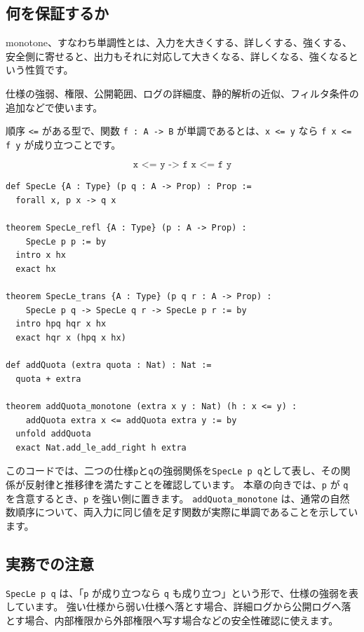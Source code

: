 \subsection{何を保証するか}

monotone、すなわち単調性とは、入力を大きくする、詳しくする、強くする、安全側に寄せると、出力もそれに対応して大きくなる、詳しくなる、強くなるという性質です。

仕様の強弱、権限、公開範囲、ログの詳細度、静的解析の近似、フィルタ条件の追加などで使います。

順序 \texttt{<=} がある型で、関数 \texttt{f : A -> B} が単調であるとは、\texttt{x <= y} なら \texttt{f x <= f y} が成り立つことです。

\[
\texttt{x <= y -> f x <= f y}
\]

\begin{listing}[htbp]
\begin{verbatim}
def SpecLe {A : Type} (p q : A -> Prop) : Prop :=
  forall x, p x -> q x

theorem SpecLe_refl {A : Type} (p : A -> Prop) :
    SpecLe p p := by
  intro x hx
  exact hx

theorem SpecLe_trans {A : Type} (p q r : A -> Prop) :
    SpecLe p q -> SpecLe q r -> SpecLe p r := by
  intro hpq hqr x hx
  exact hqr x (hpq x hx)

def addQuota (extra quota : Nat) : Nat :=
  quota + extra

theorem addQuota_monotone (extra x y : Nat) (h : x <= y) :
    addQuota extra x <= addQuota extra y := by
  unfold addQuota
  exact Nat.add_le_add_right h extra
\end{verbatim}
\caption{\texttt{SpecLe}・\texttt{addQuota\_monotone}}
\label{lst:appc_monotone}
\end{listing}

このコードでは、二つの仕様\texttt{p}と\texttt{q}の強弱関係を\texttt{SpecLe p q}として表し、その関係が反射律と推移律を満たすことを確認しています。
本章の向きでは、\texttt{p} が \texttt{q} を含意するとき、\texttt{p} を強い側に置きます。
\texttt{addQuota\_monotone} は、通常の自然数順序について、両入力に同じ値を足す関数が実際に単調であることを示しています。

\subsection{実務での注意}

\texttt{SpecLe p q} は、「\texttt{p} が成り立つなら \texttt{q} も成り立つ」という形で、仕様の強弱を表しています。
強い仕様から弱い仕様へ落とす場合、詳細ログから公開ログへ落とす場合、内部権限から外部権限へ写す場合などの安全性確認に使えます。

